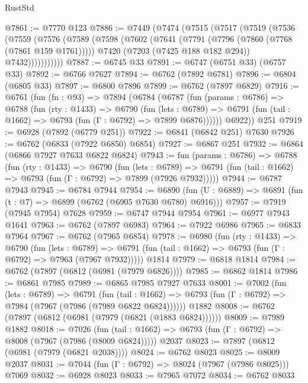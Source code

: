 \begin{lexlean}{RustStd}
\begin{coremodule}
{\begin{coremodule}
{{{{{{{{{{{{{{{{{{{{{{{{{{{{{{{{{{{{{{{{{{{{@7861 := @7770 @123
@7886 := @7449
    (@7474
      (@7515
        (@7517
          (@7519
            (@7536
              (@7559
                (@7576
                  (@7589
                    (@7598
                      (@7602
                        (@7641
                          (@7791 (@7796 (@7860 (@7768 (@7861 @159 @1761)))))
                          @7420
                          (@7203 (@7425 @188 @182 @294))
                          @7432)))))))))))
@7887 := @6745 @33
@7891 := @6747 (@6751 @33) (@6757 @33)
@7892 := @6766 @7627
@7894 := @6762 (@7892 @6781)
@7896 := @6804 (@6805 @33)
@7897 := @6800 @7896
@7899 := @6762 (@7897 @6829)
@7916 := @6761
    (fun (fn : @93) =>
    @7894
      (@6784
        (@6787
          (fun (params : @6786) =>
          @6788
            (fun (rty : @1433) =>
            @6790
              (fun (lets : @6789) =>
              @6791 (fun (tail : @1662) => @6793 (fun (Γ : @6792) => @7899 @6876))))))
        @6922))
    @251
@7919 := @6928 (@7892 (@6779 @251))
@7922 := @6841 (@6842 @251) @7630
@7926 := @6762 (@6833 (@7922 @6850) @6854)
@7927 := @6867 @251
@7932 := @6864 (@6866 @7927 @7633 @6822 @6824)
@7943 := fun (params : @6786) =>
  @6788
    (fun (rty : @1433) =>
    @6790
      (fun (lets : @6789) =>
      @6791 (fun (tail : @1662) => @6793 (fun (Γ : @6792) => @7899 (@7926 @7932)))))
@7944 := @6787 @7943
@7945 := @6784 @7944
@7954 := @6890 (fun (U : @6889) => @6891 (fun (t : @7) => @6899 (@6762 (@6905 @7630 @6780) @6916)))
@7957 := @7919 (@7945 @7954) @7628
@7959 := @6747 @7944 @7954
@7961 := @6977 @7943 @1641
@7963 := @6762 (@7897 @6983)
@7964 := @7922 @6986
@7965 := @6833 @7964
@7967 := @6762 (@7965 @6854)
@7978 := @6980
    (fun (rty : @1433) =>
    @6790
      (fun (lets : @6789) =>
      @6791 (fun (tail : @1662) => @6793 (fun (Γ : @6792) => @7963 (@7967 @7932)))))
    @1814
@7979 := @6818 @1814
@7984 := @6762 (@7897 (@6812 (@6981 (@7979 @6826))))
@7985 := @6862 @1814
@7986 := @6861 @7985
@7989 := @6865 @7985 @7927 @7633
@8001 := @7002
    (fun (lets : @6789) =>
    @6791
      (fun (tail : @1662) => @6793 (fun (Γ : @6792) => @7984 (@7967 (@7986 (@7989 @6822 @6824))))))
    @1882
@8008 := @6762 (@7897 (@6812 (@6981 (@7979 (@6821 (@1883 @6824))))))
@8009 := @7989 @1882
@8018 := @7026
    (fun (tail : @1662) => @6793 (fun (Γ : @6792) => @8008 (@7967 (@7986 (@8009 @6824)))))
    @2037
@8023 := @7897 (@6812 (@6981 (@7979 (@6821 @2038))))
@8024 := @6762 @8023
@8025 := @8009 @2037
@8031 := @7044 (fun (Γ : @6792) => @8024 (@7967 (@7986 @8025))) @7069
@8032 := @6928 @8023
@8033 := @7965 @7072
@8034 := @6762 @8033
}}}}}}}}}}}}}}}}}}}}}}}}}}}}}}}}}}}}}}}}}}}}
\end{coremodule}}
\end{coremodule}
\end{lexlean}
